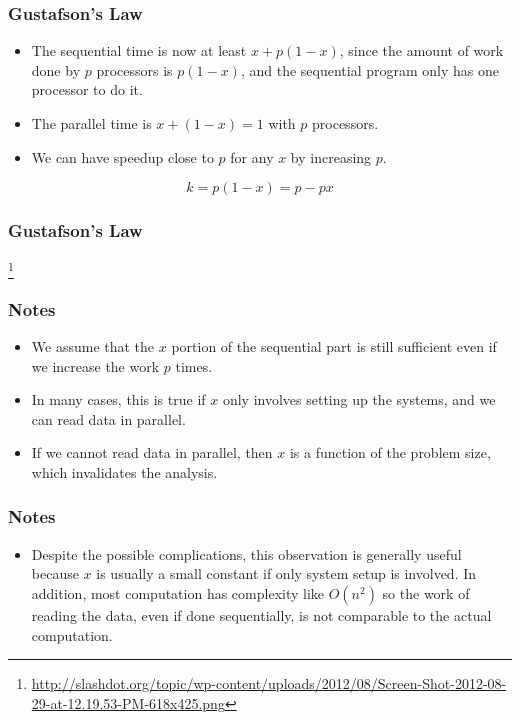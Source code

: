 \documentclass{beamer}
\begin{document}
\begin{CJK}{UTF8}{bsmi}
\begin{frame}
\frametitle{Gustafson's Law} 
\begin{itemize}
\item The sequential time is now at least $x + p (1-x)$, since the
  amount of work done by $p$ processors is $p (1 - x)$, and the
  sequential program only has one processor to do it.
\item The parallel time is $x + (1-x) = 1$ with $p$ processors.
\item We can have speedup close to $p$ for any $x$ by increasing $p$.
\end{itemize}
\begin{equation}
k = p (1 - x) = p - px
\end{equation}
\end{frame}

\begin{frame}
\frametitle{Gustafson's Law} 
\centerline{}
\footnote{\url{http://slashdot.org/topic/wp-content/uploads/2012/08/Screen-Shot-2012-08-29-at-12.19.53-PM-618x425.png}}
\end{frame}

\begin{frame}
\frametitle{Notes}
\begin{itemize}
\item We assume that the $x$ portion of the sequential part is still sufficient even if we increase the work $p$ times.
\item In many cases, this is true if $x$ only involves setting up the
  systems, and we can read data in parallel.
\item If we cannot read data in parallel, then $x$ is a function of the problem size, which invalidates the analysis.
\end{itemize}
\end{frame}

\begin{frame}
\frametitle{Notes}
\begin{itemize}
\item Despite the possible complications, this observation is generally
  useful because $x$ is usually a small constant if only system setup
  is involved.  In addition, most computation has complexity like
  $O(n^2)$ so the work of reading the data, even if done sequentially,
  is not comparable to the actual computation.
\end{itemize}
\end{frame}


\end{CJK}
\end{document}
